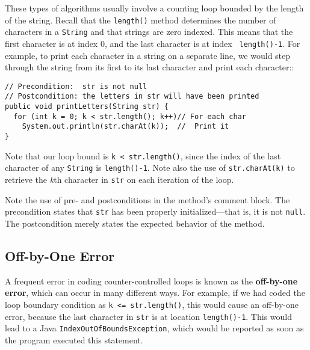 These types of algorithms usually involve a counting loop bounded by
 the length of the string. Recall
that the {\tt length()} method determines the number of characters in
a {\tt String} and that strings are zero indexed.  This means that the
first character is at index 0, and the last character is at index {\tt
length()-1}.  For example, to print each character in a string on a
separate line, we would step through the string from its first to its
last character and print each character::

\begin{jjjlisting}[26.5pc]
\begin{lstlisting}
// Precondition:  str is not null
// Postcondition: the letters in str will have been printed
public void printLetters(String str) {
  for (int k = 0; k < str.length(); k++)// For each char
    System.out.println(str.charAt(k));  //  Print it
}
\end{lstlisting}
\end{jjjlisting}

\noindent Note that our loop bound is \verb|k < str.length()|, since
the index of the last character of any {\tt String} is
{\tt length()-1}. Note also the use of {\tt str.charAt(k)} to retrieve the
{\it k}th character in {\tt str} on each iteration of the loop.

Note the use of pre- and postconditions in the method's comment block.
The precondition states that {\tt str} has been properly
initialized---that is, it is not {\tt null}. The postcondition merely
states the expected behavior of the method.

\subsection{Off-by-One Error}
\noindent A frequent error in coding counter-controlled loops is known as the
{\bf off-by-one error}, which can occur in many different ways.  For
example, if we had coded the loop boundary condition as
\verb|k <= str.length()|, this would cause an
off-by-one error, because the last
character in {\tt str} is at location {\tt length()-1}.  This would
lead to a Java {\tt IndexOutOfBoundsException}, which would be reported
as soon as the program executed this statement.

